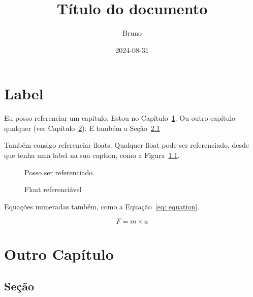 \documentclass[dsc,male,12pt,a4paper,oneside]{ita}
\title{Título do documento}
\author{Bruno}
\date{2024-08-31}
\begin{document}
\frontmatter
\maketitle

\listoffigures
\listoftables

\tableofcontents

\mainmatter
\chapter{Label}\label{ch: Chapter label}

Eu posso referenciar um capítulo. Estou no Capítulo~\ref{ch: Chapter label}. Ou outro capítulo qualquer (ver Capítulo~\ref{ch: Chapter other}).
E também a Seção~\ref{sec: section}

Também consigo referenciar floats. Qualquer float pode ser referenciado, desde que tenha uma label na sua caption, como a Figura~\ref{fig: Float}.\par
\begin{figure}[htbp]
	\centering
	Posso ser referenciado.
	\caption{Float referenciável}\label{fig: Float}
\end{figure}

Equações numeradas também, como a Equação~\ref{eq: equation}.\par
\begin{equation}
	F = m \times a
	\label{eq: equation}
\end{equation}

\chapter{Outro Capítulo}\label{ch: Chapter other}
\section{Seção}\label{sec: section}
\end{document}

